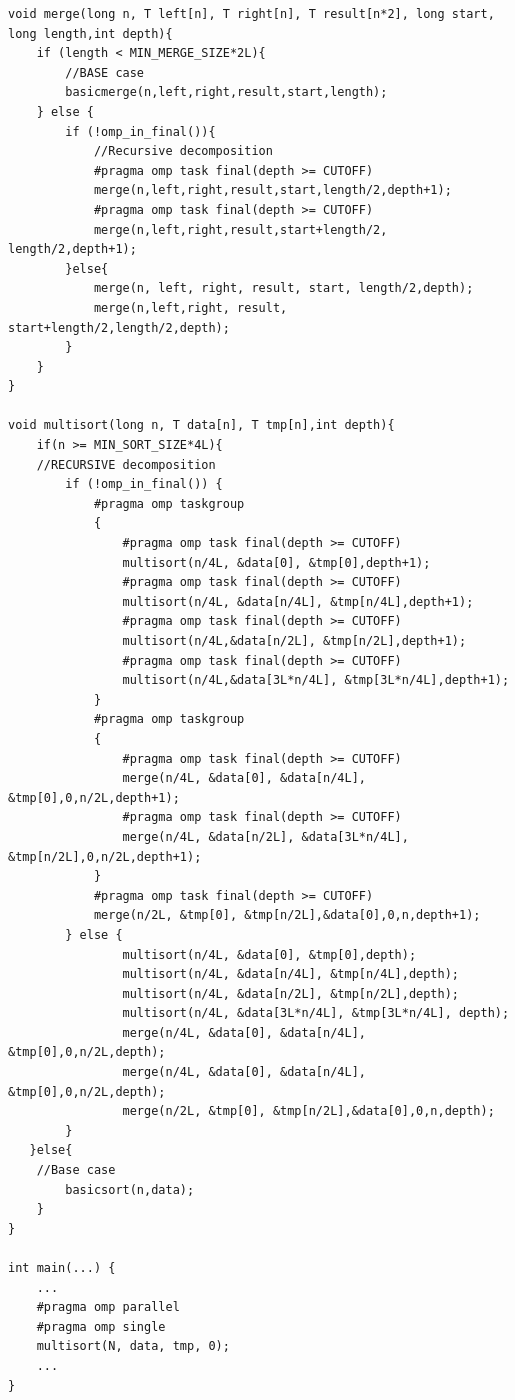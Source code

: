 \documentclass[12]{article}
\begin{document}
\begin{lstlisting}[frame=single]
void merge(long n, T left[n], T right[n], T result[n*2], long start, long length,int depth){
    if (length < MIN_MERGE_SIZE*2L){
        //BASE case
        basicmerge(n,left,right,result,start,length);
    } else {
        if (!omp_in_final()){
            //Recursive decomposition
            #pragma omp task final(depth >= CUTOFF)
            merge(n,left,right,result,start,length/2,depth+1);
            #pragma omp task final(depth >= CUTOFF)
            merge(n,left,right,result,start+length/2, length/2,depth+1);
        }else{
            merge(n, left, right, result, start, length/2,depth);
            merge(n,left,right, result, start+length/2,length/2,depth);
        }
    }
}

void multisort(long n, T data[n], T tmp[n],int depth){
    if(n >= MIN_SORT_SIZE*4L){
    //RECURSIVE decomposition
        if (!omp_in_final()) {
            #pragma omp taskgroup
            {
                #pragma omp task final(depth >= CUTOFF)
                multisort(n/4L, &data[0], &tmp[0],depth+1);
                #pragma omp task final(depth >= CUTOFF)
                multisort(n/4L, &data[n/4L], &tmp[n/4L],depth+1);
                #pragma omp task final(depth >= CUTOFF)
                multisort(n/4L,&data[n/2L], &tmp[n/2L],depth+1);
                #pragma omp task final(depth >= CUTOFF)
                multisort(n/4L,&data[3L*n/4L], &tmp[3L*n/4L],depth+1);
            }
            #pragma omp taskgroup
            {
                #pragma omp task final(depth >= CUTOFF)
                merge(n/4L, &data[0], &data[n/4L], &tmp[0],0,n/2L,depth+1);
                #pragma omp task final(depth >= CUTOFF)
                merge(n/4L, &data[n/2L], &data[3L*n/4L], &tmp[n/2L],0,n/2L,depth+1);
            }
            #pragma omp task final(depth >= CUTOFF)
            merge(n/2L, &tmp[0], &tmp[n/2L],&data[0],0,n,depth+1);
        } else {
                multisort(n/4L, &data[0], &tmp[0],depth);
                multisort(n/4L, &data[n/4L], &tmp[n/4L],depth);
                multisort(n/4L, &data[n/2L], &tmp[n/2L],depth);
                multisort(n/4L, &data[3L*n/4L], &tmp[3L*n/4L], depth);
                merge(n/4L, &data[0], &data[n/4L], &tmp[0],0,n/2L,depth);
                merge(n/4L, &data[0], &data[n/4L], &tmp[0],0,n/2L,depth);
                merge(n/2L, &tmp[0], &tmp[n/2L],&data[0],0,n,depth);
        }
   }else{
    //Base case
        basicsort(n,data);
    }
}

int main(...) {
    ...
    #pragma omp parallel
    #pragma omp single
    multisort(N, data, tmp, 0);
    ...
}
\end{lstlisting}
\end{document}
